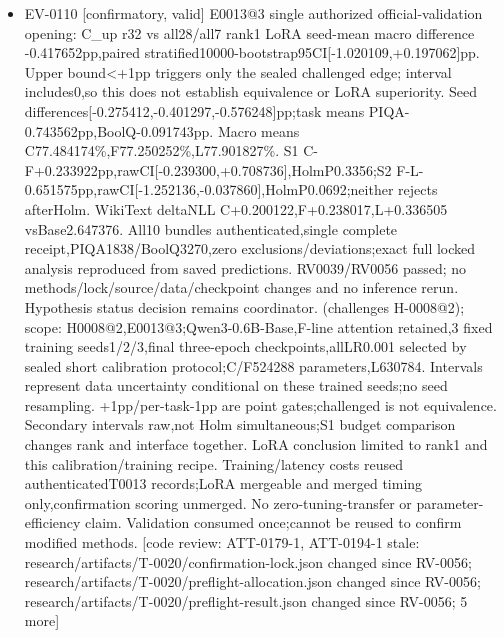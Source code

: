 \documentclass[11pt]{article}
\begin{document}
\begin{itemize}
\item EV-0110 [confirmatory, valid] E0013@3 single authorized official-validation opening: C\_up r32 vs all28/all7 rank1 LoRA seed-mean macro difference -0.417652pp,paired stratified10000-bootstrap95CI[-1.020109,+0.197062]pp. Upper bound\textless{}+1pp triggers only the sealed challenged edge; interval includes0,so this does not establish equivalence or LoRA superiority. Seed differences[-0.275412,-0.401297,-0.576248]pp;task means PIQA-0.743562pp,BoolQ-0.091743pp. Macro means C77.484174\%,F77.250252\%,L77.901827\%. S1 C-F+0.233922pp,rawCI[-0.239300,+0.708736],HolmP0.3356;S2 F-L-0.651575pp,rawCI[-1.252136,-0.037860],HolmP0.0692;neither rejects afterHolm. WikiText deltaNLL C+0.200122,F+0.238017,L+0.336505 vsBase2.647376. All10 bundles authenticated,single complete receipt,PIQA1838/BoolQ3270,zero exclusions/deviations;exact full locked analysis reproduced from saved predictions. RV0039/RV0056 passed; no methods/lock/source/data/checkpoint changes and no inference rerun. Hypothesis status decision remains coordinator. (challenges H-0008@2); scope: H0008@2,E0013@3;Qwen3-0.6B-Base,F-line attention retained,3 fixed training seeds1/2/3,final three-epoch checkpoints,allLR0.001 selected by sealed short calibration protocol;C/F524288 parameters,L630784. Intervals represent data uncertainty conditional on these trained seeds;no seed resampling. +1pp/per-task-1pp are point gates;challenged is not equivalence. Secondary intervals raw,not Holm simultaneous;S1 budget comparison changes rank and interface together. LoRA conclusion limited to rank1 and this calibration/training recipe. Training/latency costs reused authenticatedT0013 records;LoRA mergeable and merged timing only,confirmation scoring unmerged. No zero-tuning-transfer or parameter-efficiency claim. Validation consumed once;cannot be reused to confirm modified methods. [code review: ATT-0179-1, ATT-0194-1 stale: research/artifacts/T-0020/confirmation-lock.json changed since RV-0056; research/artifacts/T-0020/preflight-allocation.json changed since RV-0056; research/artifacts/T-0020/preflight-result.json changed since RV-0056; 5 more]

\end{itemize}
\end{document}

